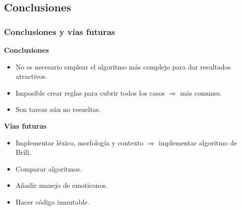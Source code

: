 \documentclass{beamer}
\begin{document}
\subsection{Conclusiones}

\begin{frame}
\frametitle{Conclusiones y vías futuras}
\textbf{Conclusiones}
\begin{itemize}
\item No es necesario emplear el algoritmo más complejo para dar resultados atractivos.
\item Imposible crear reglas para cubrir todos los casos $\Rightarrow$ más comunes. 
\item Son tareas aún no resueltas.
\end{itemize}
\textbf{Vías futuras}
\begin{itemize}
\item Implementar léxico, morfología y contexto $\Rightarrow$ implementar algoritmo de Brill.
\item Comparar algoritmos.
\item Añadir manejo de emoticonos. 
\item Hacer código inmutable.
\end{itemize}
\end{frame}



\end{document}
